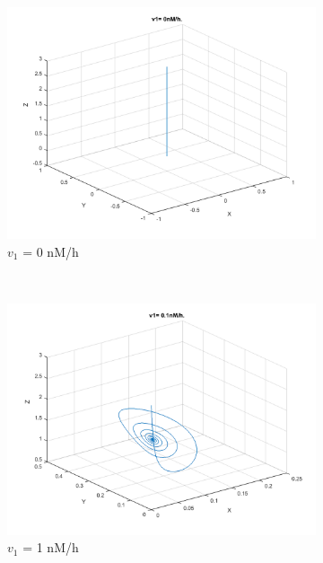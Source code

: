 \documentclass[10pt,a4paper,oneside,twocolumn]{article}
\numberwithin{equation}{section} %
\begin{document}
    \begin{figure}
    \centering
	\begin{subfigure}[b]{0.32\textwidth}
	    \includegraphics[width=\textwidth]{LotsofthesameA/A-AA0.png}
	    \caption{$v_1$ = 0 nM/h}
	\end{subfigure}
	~ 
	\begin{subfigure}[b]{0.32\textwidth}
	    \includegraphics[width=\textwidth]{LotsofthesameA/A-AA1.png}
	    \caption{$v_1$ = 1 nM/h}
	\end{subfigure}
	~ 
	\begin{subfigure}[b]{0.32\textwidth}

\end{subfigure}
\end{figure}
\end{document}

